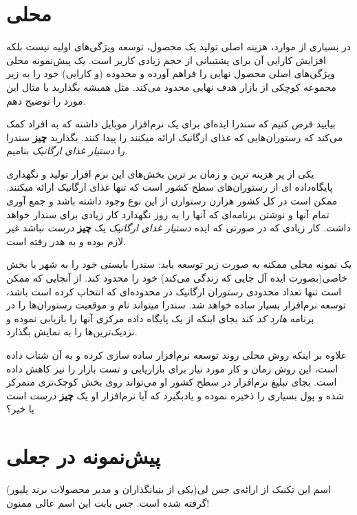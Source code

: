\section{محلی}\label{ux645ux62dux644ux6cc}

در بسیاری از موارد، هزینه اصلی تولید یک محصول، توسعه ویژگی‌های اولیه
نیست بلکه افزایش کارایی آن برای پشتیبانی از حجم زیادی کاربر است. یک
پیش‌نمونه محلی ویژگی‌های اصلی محصول نهایی را فراهم آورده و محدوده (و
کارایی) خود را به زیر مجموعه کوچکی از بازار هدف نهایی محدود می‌کند. مثل
همیشه بگذارید با مثال این مورد را توضیح دهم.

بیایید فرض کنیم که سندرا ایده‌ای برای یک نرم‌افزار موبایل داشته که به
افراد کمک می‌کند که رستوران‌هایی که غذای ارگانیک ارائه میکنند را پیدا
کنند. بگذارید \textbf{چیز} سندرا را \emph{دستیار غذای ارگانیک} بنامیم.

یکی از پر هزینه ترین و زمان بر ترین بخش‌های این نرم افزار تولید و
نگهداری پایگاه‌داده ای از رستوران‌های سطح کشور است که تنها غذای ارگانیک
ارائه میکنند. ممکن است در کل کشور هزارن رستوارن از این نوع وجود داشته
باشد و جمع آوری تمام آنها و نوشتن برنامه‌ای که آنها را به روز نگهدارد
کار زیادی برای سندار خواهد داشت. کار زیادی که در صورتی که ایده
\emph{دستیار غذای ارگانیک} یک \textbf{چیز} \emph{درست} نباشد غیر لازم
بوده و به هدر رفته است.

یک نمونه محلی ممکنه به صورت زیر توسعه یابد: سندرا بایستی خود را به شهر
یا بخش خاصی(بصورت ایده آل جایی که زندگی می‌کند) خود را محدود کند. از
آنجایی که ممکن است تنها تعداد محدودی رستوران ارگانیک در محدوده‌ای که
انتخاب کرده است باشد، توسعه نرم‌افزار بسیار ساده خواهد شد. سندرا میتواند
نام و موقعیت رستوران‌ها را در برنامه \emph{هارد کد} کند بجای اینکه از یک
پایگاه داده مرکزی آنها را بازیابی نموده و نزدیک‌ترین‌ها را به نمایش
بگذارد.

علاوه بر اینکه روش محلی روند توسعه نرم‌افزار ساده سازی کرده و به آن شتاب
داده است، این روش زمان و کار مورد نیاز برای بازاریابی و تست بازار را نیز
کاهش داده است. بجای تبلیغ نرم‌افزار در سطح کشور او می‌تواند روی بخش
کوچک‌تری متمرکز شده و پول بسیاری را ذخیره نموده و یادبگیرد که آیا
نرم‌افزار او یک \textbf{چیز} \emph{درست} است یا خیر؟

\section{پیش‌نمونه در
جعلی}\label{ux67eux6ccux634ux646ux645ux648ux646ux647-ux62fux631-ux62cux639ux644ux6cc}

اسم این تکنیک از ارائه‌ی جس لی(یکی از بنیانگذاران و مدیر محصولات برند
پلیور) گرفته شده است. جس بابت این اسم عالی ممنون!

